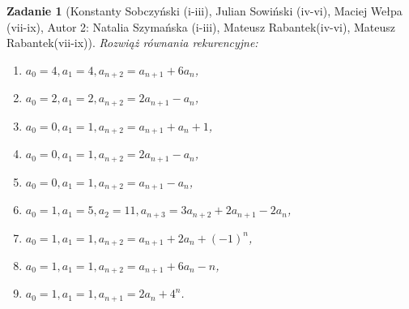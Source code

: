 \documentclass{mwart}
\newtheorem{zad}{Zadanie}[section]
\begin{document}
\begin{zad}[Konstanty Sobczyński (i-iii), Julian Sowiński (iv-vi), Maciej Wełpa (vii-ix), Autor 2: Natalia Szymańska (i-iii), Mateusz Rabantek(iv-vi), Mateusz Rabantek(vii-ix)]
    Rozwiąż równania rekurencyjne:
    \begin{enumerate}
        \item $a_0=4, a_1=4, a_{n+2}=a_{n+1}+6a_n$,
        \item $a_0=2, a_1=2, a_{n+2}=2a_{n+1}-a_n$,
        \item $a_0=0, a_1=1, a_{n+2}=a_{n+1}+a_n+1$,
        \item $a_0=0, a_1=1, a_{n+2}=2a_{n+1}-a_n$,
        \item $a_0=0, a_1=1, a_{n+2}=a_{n+1}-a_n$,
        \item $a_0=1, a_1=5, a_2=11, a_{n+3}=3a_{n+2}+2a_{n+1}-2a_n$,
        \item $a_0=1, a_1=1, a_{n+2}=a_{n+1}+2a_n+(-1)^n$,
        \item $a_0=1, a_1=1, a_{n+2}=a_{n+1}+6a_n-n$,
        \item $a_0=1, a_1=1, a_{n+1}=2a_n+4^n$.
    \end{enumerate}
\end{zad}
\end{document}
